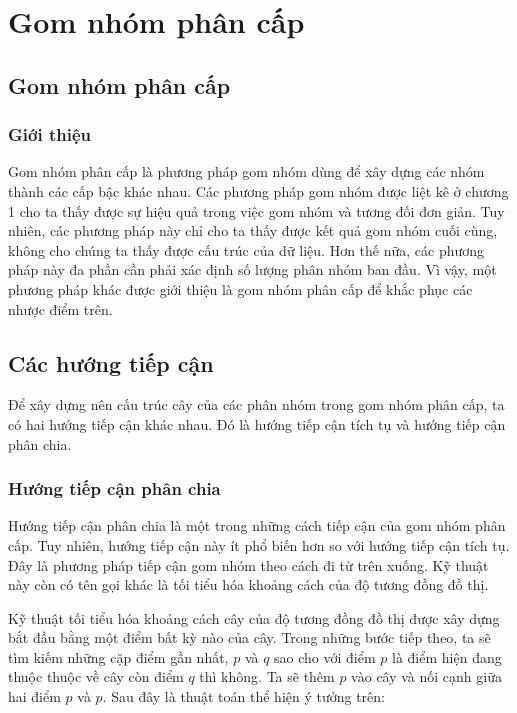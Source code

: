 \chapter{Gom nhóm phân cấp}
\label{Chapter2}

\section{Gom nhóm phân cấp}
\subsection{Giới thiệu}
Gom nhóm phân cấp là phương pháp gom nhóm dùng để xây dựng các nhóm thành các cấp bậc khác nhau.
Các phương pháp gom nhóm được liệt kê ở chương 1 cho ta thấy được sự hiệu quả trong việc gom nhóm và tương đối đơn giản.
Tuy nhiên, các phương pháp này chỉ cho ta thấy được kết quả gom nhóm cuối cùng, không cho chúng ta thấy được cấu trúc của dữ liệu.
Hơn thế nữa, các phương pháp này đa phần cần phải xác định số lượng phân nhóm ban đầu.
Vì vậy, một phương pháp khác được giới thiệu là gom nhóm phân cấp để khắc phục các nhược điểm trên.

\section{Các hướng tiếp cận}
Để xây dựng nên cấu trúc cây của các phân nhóm trong gom nhóm phân cấp, ta có hai hướng tiếp cận khác nhau. Đó là hướng tiếp cận tích tụ và hướng tiếp cận phân chia.

\subsection{Hướng tiếp cận phân chia}
Hướng tiếp cận phân chia là một trong những cách tiếp cận của gom nhóm phân cấp.
Tuy nhiên, hướng tiếp cận này ít phổ biến hơn so với hướng tiếp cận tích tụ.
Đây là phương pháp tiếp cận gom nhóm theo cách đi từ trên xuống.
Kỹ thuật này còn có tên gọi khác là tối tiểu hóa khoảng cách của độ tương đồng đồ thị.

Kỹ thuật tối tiểu hóa khoảng cách cây của độ tương đồng đồ thị được xây dựng bắt đầu bằng một điểm bất kỳ nào của cây.
Trong những bước tiếp theo, ta sẽ tìm kiếm những cặp điểm gần nhất, $p$ và $q$ sao cho với điểm $p$ là điểm hiện đang thuộc thuộc về cây còn điểm $q$ thì không.
Ta sẽ thêm $p$ vào cây và nối cạnh giữa hai điểm $p$ và $p$.
Sau đây là thuật toán thể hiện ý tưởng trên:


